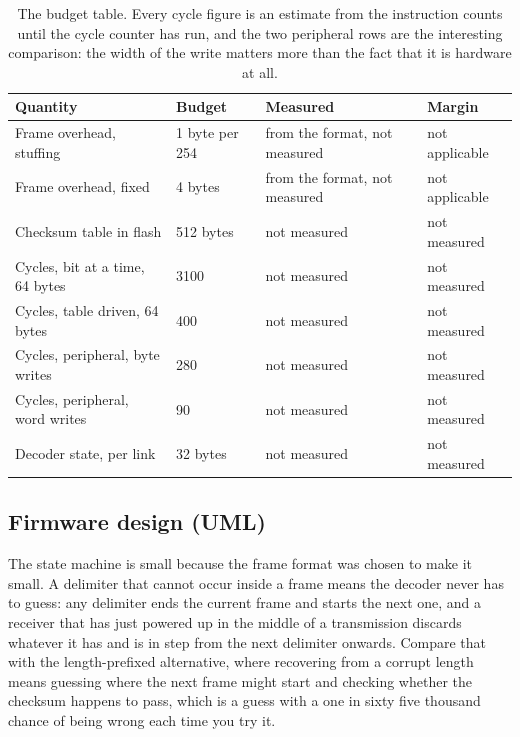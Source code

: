\begin{table}[H]\centering\small
\begin{tabular}{p{44mm}p{28mm}p{28mm}p{30mm}}
\toprule
Quantity & Budget & Measured & Margin \\
\midrule
Frame overhead, stuffing & 1 byte per 254 & from the format, not measured & not applicable \\
Frame overhead, fixed & 4 bytes & from the format, not measured & not applicable \\
Checksum table in flash & 512 bytes & not measured & not measured \\
Cycles, bit at a time, 64 bytes & 3100 & not measured & not measured \\
Cycles, table driven, 64 bytes & 400 & not measured & not measured \\
Cycles, peripheral, byte writes & 280 & not measured & not measured \\
Cycles, peripheral, word writes & 90 & not measured & not measured \\
Decoder state, per link & 32 bytes & not measured & not measured \\
\bottomrule
\end{tabular}
\caption{The budget table. Every cycle figure is an estimate from the instruction counts until the cycle counter has run, and the two peripheral rows are the interesting comparison: the width of the write matters more than the fact that it is hardware at all.}
\end{table}

\subsection*{Firmware design (UML)}


The state machine is small because the frame format was chosen to make it small.
A delimiter that cannot occur inside a frame means the decoder never has to
guess: any delimiter ends the current frame and starts the next one, and a
receiver that has just powered up in the middle of a transmission discards
whatever it has and is in step from the next delimiter onwards. Compare that
with the length-prefixed alternative, where recovering from a corrupt length
means guessing where the next frame might start and checking whether the
checksum happens to pass, which is a guess with a one in sixty five thousand
chance of being wrong each time you try it.

